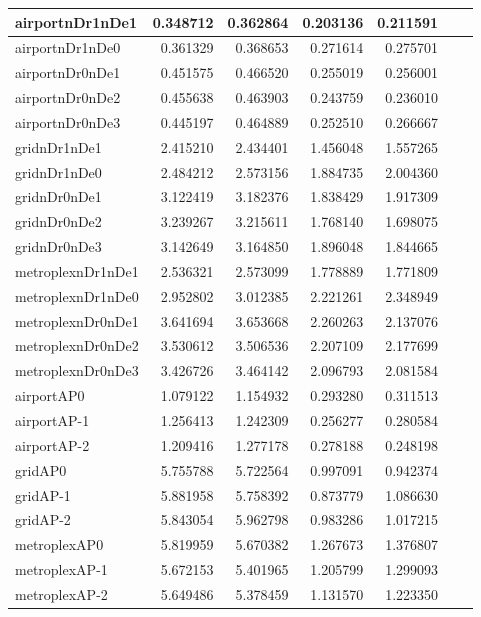 \begin{longtable}{|l|r|r|r|r|r|r|}
\endlastfoot
airportnDr1nDe1 & 0.348712 & 0.362864 & 0.203136 & 0.211591 \\ \hline
airportnDr1nDe0 & 0.361329 & 0.368653 & 0.271614 & 0.275701 \\ \hline
airportnDr0nDe1 & 0.451575 & 0.466520 & 0.255019 & 0.256001 \\ \hline
airportnDr0nDe2 & 0.455638 & 0.463903 & 0.243759 & 0.236010 \\ \hline
airportnDr0nDe3 & 0.445197 & 0.464889 & 0.252510 & 0.266667 \\ \hline
gridnDr1nDe1 & 2.415210 & 2.434401 & 1.456048 & 1.557265 \\ \hline
gridnDr1nDe0 & 2.484212 & 2.573156 & 1.884735 & 2.004360 \\ \hline
gridnDr0nDe1 & 3.122419 & 3.182376 & 1.838429 & 1.917309 \\ \hline
gridnDr0nDe2 & 3.239267 & 3.215611 & 1.768140 & 1.698075 \\ \hline
gridnDr0nDe3 & 3.142649 & 3.164850 & 1.896048 & 1.844665 \\ \hline
metroplexnDr1nDe1 & 2.536321 & 2.573099 & 1.778889 & 1.771809 \\ \hline
metroplexnDr1nDe0 & 2.952802 & 3.012385 & 2.221261 & 2.348949 \\ \hline
metroplexnDr0nDe1 & 3.641694 & 3.653668 & 2.260263 & 2.137076 \\ \hline
metroplexnDr0nDe2 & 3.530612 & 3.506536 & 2.207109 & 2.177699 \\ \hline
metroplexnDr0nDe3 & 3.426726 & 3.464142 & 2.096793 & 2.081584 \\ \hline
airportAP0 & 1.079122 & 1.154932 & 0.293280 & 0.311513 \\ \hline
airportAP-1 & 1.256413 & 1.242309 & 0.256277 & 0.280584 \\ \hline
airportAP-2 & 1.209416 & 1.277178 & 0.278188 & 0.248198 \\ \hline
gridAP0 & 5.755788 & 5.722564 & 0.997091 & 0.942374 \\ \hline
gridAP-1 & 5.881958 & 5.758392 & 0.873779 & 1.086630 \\ \hline
gridAP-2 & 5.843054 & 5.962798 & 0.983286 & 1.017215 \\ \hline
metroplexAP0 & 5.819959 & 5.670382 & 1.267673 & 1.376807 \\ \hline
metroplexAP-1 & 5.672153 & 5.401965 & 1.205799 & 1.299093 \\ \hline
metroplexAP-2 & 5.649486 & 5.378459 & 1.131570 & 1.223350 \\ \hline

\end{longtable}

